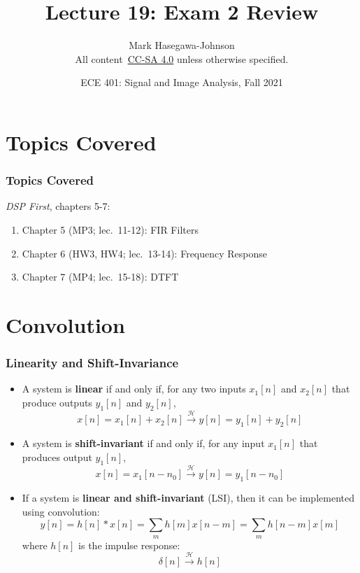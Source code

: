 \documentclass{beamer}
\title{Lecture 19: Exam 2 Review}
\author{Mark Hasegawa-Johnson\\All content~\href{https://creativecommons.org/licenses/by-sa/4.0/}{CC-SA 4.0} unless otherwise specified.}
\date{ECE 401: Signal and Image Analysis, Fall 2021}
\begin{document}
\begin{frame}
  \maketitle
\end{frame}

\begin{frame}
  \tableofcontents
\end{frame}

\section[Topics]{Topics Covered}
\setcounter{subsection}{1}

\begin{frame}
  \frametitle{Topics Covered}

  {\em DSP First}, chapters 5-7:
  \begin{enumerate}
  \item Chapter 5 (MP3; lec.~11-12): FIR Filters
  \item Chapter 6 (HW3, HW4; lec.~13-14): Frequency Response
  \item Chapter 7 (MP4; lec.~15-18): DTFT
  \end{enumerate}
\end{frame}

\section[Convolution]{Convolution}
\setcounter{subsection}{1}

\begin{frame}
  \frametitle{Linearity and Shift-Invariance}
  \begin{itemize}
  \item A system is {\bf linear} if and only if, for any two inputs
    $x_1[n]$ and $x_2[n]$ that produce outputs $y_1[n]$ and $y_2[n]$,
    \[
    x[n]=x_1[n]+x_2[n] \stackrel{\mathcal H}{\longrightarrow}  y[n]=y_1[n]+y_2[n]
    \]
  \item A system is {\bf shift-invariant} if and only if, for any input
    $x_1[n]$ that produces output $y_1[n]$,
    \[
    x[n]=x_1[n-n_0] \stackrel{\mathcal H}{\longrightarrow}  y[n]=y_1[n-n_0]
    \]
  \item If a system is {\bf linear and shift-invariant} (LSI), then it
    can be implemented using convolution:
    \[
    y[n] = h[n]\ast x[n]=\sum_m h[m] x[n-m] = \sum_m h[n-m] x[m]
    \]
    where $h[n]$ is the impulse response:
    \[
    \delta[n] \stackrel{\mathcal H}{\longrightarrow}  h[n]
    \]
  \end{itemize}
\end{frame}
\end{document}
